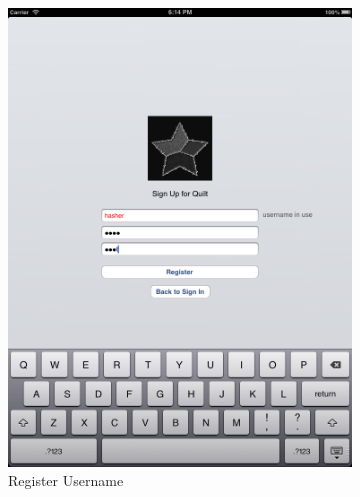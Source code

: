 \documentclass[a4wide, 10pt]{article}
\begin{document}
\begin{figure}
        \centering
        \begin{subfigure}[b]{0.4\textwidth}
                \centering
                \includegraphics[width=\textwidth]{"screenshots/Unavailable User"}
                \caption{Register Username}
        \end{subfigure}%
        ~ %
        \begin{subfigure}[b]{0.4\textwidth}
                \centering

\end{subfigure}
\end{figure}
\end{document}

